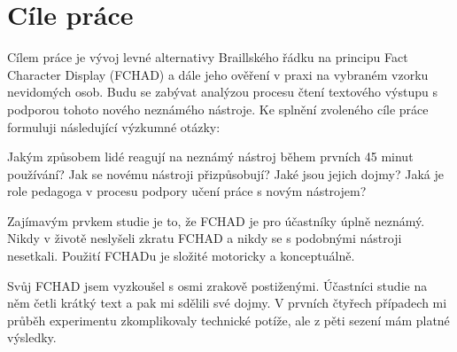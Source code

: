 \section{Cíle práce}

Cílem práce je vývoj levné alternativy Braillského řádku na principu Fact Character Display (FCHAD) a dále jeho ověření v praxi na vybraném vzorku nevidomých osob. Budu se zabývat analýzou procesu čtení textového výstupu s podporou tohoto nového neznámého nástroje. Ke splnění zvoleného cíle práce formuluji následující výzkumné otázky:

Jakým způsobem lidé reagují na neznámý nástroj během prvních 45 minut používání?  Jak se novému nástroji přizpůsobují?  Jaké jsou jejich dojmy? Jaká je role pedagoga v procesu podpory učení práce s novým nástrojem?

Zajímavým prvkem studie je to, že FCHAD je pro účastníky úplně neznámý.  Nikdy v životě neslyšeli zkratu FCHAD a nikdy se s podobnými nástroji nesetkali.  Použití FCHADu je složité motoricky a konceptuálně.

Svůj FCHAD jsem vyzkoušel s osmi zrakově postiženými. Účastníci studie na něm četli krátký text a pak mi sdělili své dojmy.  V prvních čtyřech případech mi průběh experimentu zkomplikovaly technické potíže, ale z pěti sezení mám platné výsledky.
